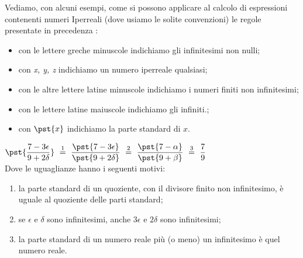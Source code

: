 Vediamo, con alcuni esempi, come si possono applicare al calcolo di espressioni 
contenenti numeri Iperreali (dove usiamo le solite convenzioni) le regole presentate 
in precedenza :
\begin{itemize} [noitemsep]
 \item con le lettere greche minuscole indichiamo gli infinitesimi non nulli;
 \item con \emph{x, y, z} indichiamo un numero iperreale qualsiasi;
 \item con le altre lettere latine minuscole indichiamo i numeri finiti non 
infinitesimi;
 \item con le lettere latine maiuscole indichiamo gli infiniti.;
 \item con \(\pst{x}\) indichiamo la parte standard di \(x\).
\end{itemize}

\begin{esempio}

\(\pst{\dfrac{7 -3 \epsilon}{9 +2 \delta}} 
~ \stackrel{1}{=} ~
  \dfrac{\pst{7 -3 \epsilon}}{\pst{9 +2 \delta}} 
~ \stackrel{2}{=} ~
  \dfrac{\pst{7 -\alpha}}{\pst{9 +\beta}} 
~ \stackrel{3}{=} ~
  \dfrac{7}{9}\)\\

Dove le uguaglianze hanno i seguenti motivi:
\begin{enumerate} [nosep]
 \item la parte standard di un quoziente, con il divisore finito non 
infinitesimo, è uguale al quoziente delle parti standard; 
 \item se \(\epsilon \text{ e } \delta\) sono infinitesimi, 
 anche \(3\epsilon\) e \(2 \delta\) sono infinitesimi;
 \item la parte standard di un numero reale più (o meno) un infinitesimo è quel 
numero reale.
\end{enumerate}
\end{esempio}

